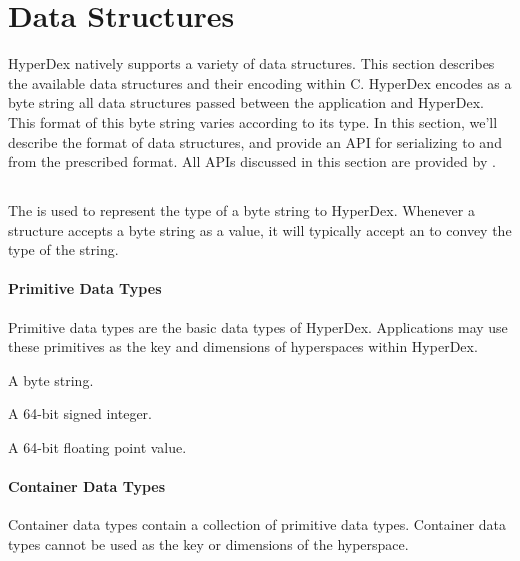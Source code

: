 \section{Data Structures}
\label{sec:api:c:client:data-structures}

HyperDex natively supports a variety of data structures.  This section describes
the available data structures and their encoding within C.  HyperDex encodes as
a byte string all data structures passed between the application and HyperDex.
This format of this byte string varies according to its type.  In this section,
we'll describe the format of data structures, and provide an API for serializing
to and from the prescribed format.  All APIs discussed in this section are
provided by .

\subsection{}
\label{sec:api:c:client:hyperdatatype}

The  is used to represent the type of a byte string to
HyperDex.  Whenever a structure accepts a byte string as a value, it will
typically accept an  to convey the type of the string.

\paragraph{Primitive Data Types}

Primitive data types are the basic data types of HyperDex.  Applications may use
these primitives as the key and dimensions of hyperspaces within HyperDex.

\begin{description}[noitemsep]
\item[\code{HYPERDATATYPE\_STRING}] A byte string.
\item[\code{HYPERDATATYPE\_INT64}] A 64-bit signed integer.
\item[\code{HYPERDATATYPE\_FLOAT}] A 64-bit floating point value.
\end{description}

\paragraph{Container Data Types}

Container data types contain a collection of primitive data types.  Container
data types cannot be used as the key or dimensions of the hyperspace.

